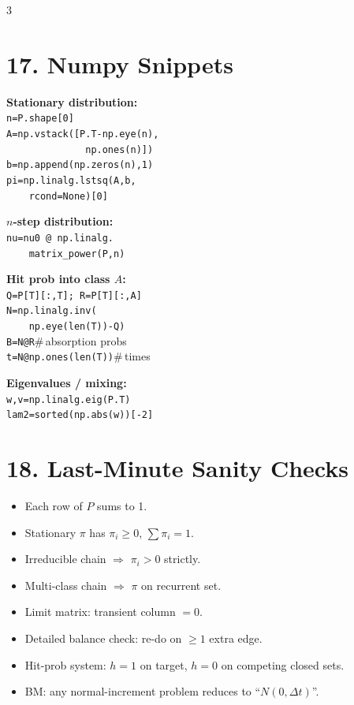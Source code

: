 \documentclass[8pt]{extarticle}
\begin{document}
\begin{multicols*}{3}
		\section*{17. Numpy Snippets}
		
		\textbf{Stationary distribution:}\\
		\texttt{n=P.shape[0]}\\
		\texttt{A=np.vstack([P.T-np.eye(n),}\\
		\texttt{\ \ \ \ \ \ \ \ \ \ \ \ \ \ np.ones(n)])}\\
		\texttt{b=np.append(np.zeros(n),1)}\\
		\texttt{pi=np.linalg.lstsq(A,b,}\\
		\texttt{\ \ \ \ rcond=None)[0]}
		
		\textbf{$n$-step distribution:}\\
		\texttt{nu=nu0 @ np.linalg.}\\
		\texttt{\ \ \ \ matrix\_power(P,n)}
		
		\textbf{Hit prob into class $A$:}\\
		\texttt{Q=P[T][:,T]; R=P[T][:,A]}\\
		\texttt{N=np.linalg.inv(}\\
		\texttt{\ \ \ \ np.eye(len(T))-Q)}\\
		\texttt{B=N@R}\quad\#\,absorption probs\\
		\texttt{t=N@np.ones(len(T))}\quad\#\,times
		
		\textbf{Eigenvalues / mixing:}\\
		\texttt{w,v=np.linalg.eig(P.T)}\\
		\texttt{lam2=sorted(np.abs(w))[-2]}
		
		\section*{18. Last-Minute Sanity Checks}
		
		\begin{itemize}
			\item Each row of $P$ sums to 1.
			\item Stationary $\pi$ has $\pi_i\ge 0$, $\sum\pi_i=1$.
			\item Irreducible chain $\Rightarrow$ $\pi_i>0$ strictly.
			\item Multi-class chain $\Rightarrow$ $\pi$ on recurrent set.
			\item Limit matrix: transient column $=0$.
			\item Detailed balance check: re-do on $\ge 1$ extra edge.
			\item Hit-prob system: $h=1$ on target, $h=0$ on competing closed sets.
			\item BM: any normal-increment problem reduces to ``$N(0,\Delta t)$''.
		\end{itemize}
		
	\end{multicols*}
\end{document}
